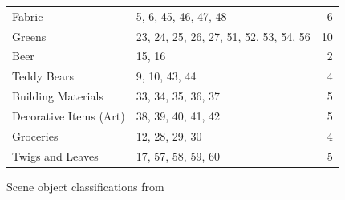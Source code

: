 \documentclass[thesis.tex]{subfiles}
\begin{document}
\begin{figure}[p]
\begin{tabular}{l l r}
		Fabric					& 5, 6, 45, 46, 47, 48						& 6 \\
		Greens					& 23, 24, 25, 26, 27, 51, 52, 53, 54, 56	& 10 \\
		Beer  					& 15, 16									& 2 \\
		Teddy Bears 			& 9, 10, 43, 44								& 4 \\
		Building Materials 		& 33, 34, 35, 36, 37						& 5 \\
		Decorative Items (Art) 	& 38, 39, 40, 41, 42						& 5 \\
		Groceries 				& 12, 28, 29, 30							& 4 \\
		Twigs and Leaves 		& 17, 57, 58, 59, 60 						& 5 \\
		\bottomrule
	\end{tabular}
	\caption{Scene object classifications from \cite[Table 1]{aanaes2010ground}}
	\label{tbl:dtu_scene_classifications}
\end{figure}
\end{document}
